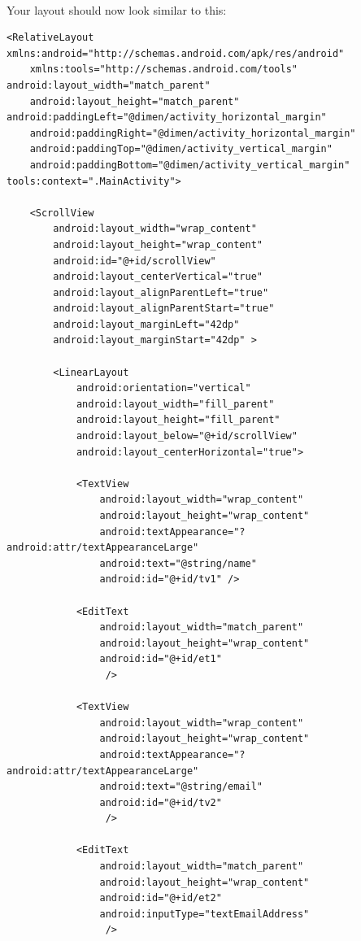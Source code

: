 \paragraph{} Your layout should now look similar to this:

\begin{lstlisting}
<RelativeLayout xmlns:android="http://schemas.android.com/apk/res/android"
    xmlns:tools="http://schemas.android.com/tools" android:layout_width="match_parent"
    android:layout_height="match_parent" android:paddingLeft="@dimen/activity_horizontal_margin"
    android:paddingRight="@dimen/activity_horizontal_margin"
    android:paddingTop="@dimen/activity_vertical_margin"
    android:paddingBottom="@dimen/activity_vertical_margin" tools:context=".MainActivity">

    <ScrollView
        android:layout_width="wrap_content"
        android:layout_height="wrap_content"
        android:id="@+id/scrollView"
        android:layout_centerVertical="true"
        android:layout_alignParentLeft="true"
        android:layout_alignParentStart="true"
        android:layout_marginLeft="42dp"
        android:layout_marginStart="42dp" >

        <LinearLayout
            android:orientation="vertical"
            android:layout_width="fill_parent"
            android:layout_height="fill_parent"
            android:layout_below="@+id/scrollView"
            android:layout_centerHorizontal="true">

            <TextView
                android:layout_width="wrap_content"
                android:layout_height="wrap_content"
                android:textAppearance="?android:attr/textAppearanceLarge"
                android:text="@string/name"
                android:id="@+id/tv1" />

            <EditText
                android:layout_width="match_parent"
                android:layout_height="wrap_content"
                android:id="@+id/et1"
                 />

            <TextView
                android:layout_width="wrap_content"
                android:layout_height="wrap_content"
                android:textAppearance="?android:attr/textAppearanceLarge"
                android:text="@string/email"
                android:id="@+id/tv2"
                 />

            <EditText
                android:layout_width="match_parent"
                android:layout_height="wrap_content"
                android:id="@+id/et2"
                android:inputType="textEmailAddress"
                 />


\end{lstlisting}
